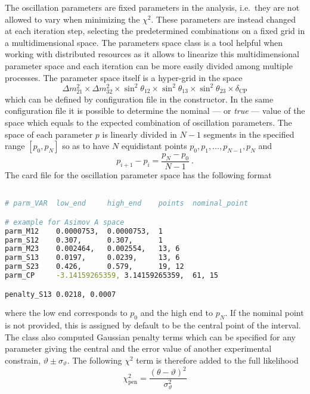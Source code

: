 \documentclass[a4paper, 11pt]{article}
\begin{document}
The oscillation parameters are fixed parameters in the analysis, i.e.\ they are not allowed to vary when minimizing the $\chi^2$.
These parameters are instead changed at each iteration step, selecting the predetermined combinations on a fixed grid in %
a multidimensional space.
The parameters space class is a tool helpful when working with distributed resources as it allows to linearize this multidimensional %
parameter space and each iteration can be more easily divided among multiple processes.
The parameter space itself is a hyper-grid in the space
\begin{equation}
	\Delta m^2_{21} \times \Delta m^2_{32} \times \sin^2\theta_{12} \times \sin^2 \theta_{13} \times \sin^2 \theta_{23} \times \delta_\text{CP}
\end{equation}
which can be defined by configuration file in the constructor.
In the same configuration file it is possible to determine the nominal --- or \emph{true} --- value of the space %
which equals to the expected combination of oscillation parameters.
The space of each parameter $p$ is linearly divided in $N-1$ segments in the specified range $[p_0, p_N]$ %
so as to have $N$ equidistant points $p_0, p_1, \ldots, p_{N-1}, p_{N}$ and 
\begin{equation}
	p_{i+1} - p_{i} = \frac{p_{N} - p_0}{N-1}\ .
\end{equation}
The card file for the oscillation parameter space has the following format
\begin{lstlisting}[language=bash]

# parm_VAR	low_end		high_end	points	nominal_point

# example for Asimov A space
parm_M12	0.0000753,	0.0000753,	1	
parm_S12	0.307,		0.307,		1	
parm_M23	0.002464,	0.002554,	13,	6
parm_S13	0.0197,		0.0239,		13,	6
parm_S23	0.426,		0.579,		19,	12
parm_CP		-3.14159265359,	3.14159265359,	61,	15

penalty_S13	0.0218, 0.0007
\end{lstlisting}
where the low end corresponds to $p_0$ and the high end to $p_N$.
If the nominal point is not provided, this is assigned by default to be the central point of the interval.
The class also computed Gaussian penalty terms which can be specified for any parameter giving the central and the error value %
of another experimental constrain, ${\vartheta} \pm \sigma_{{\vartheta}}$.
The following $\chi^2$ term is therefore added to the full likelihood
\begin{equation}
	\chi^2_\text{pen} = \frac{(\theta - {\vartheta})^2}{\sigma_{{\vartheta}}^2}
\end{equation}
\end{document}
